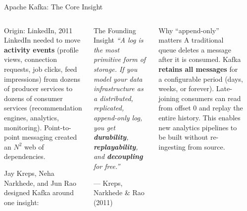 \documentclass[aspectratio=169,10pt]{beamer}
\begin{document}
\begin{frame}{Apache Kafka: The Core Insight}
  \begin{columns}[T]
      \begin{block}{Origin: LinkedIn, 2011}
        LinkedIn needed to move \textbf{activity events} (profile views, connection requests, job clicks, feed impressions) from dozens of producer services to dozens of consumer services (recommendation engines, analytics, monitoring).  Point-to-point messaging created an $N^2$ web of dependencies.

        \vspace{4pt}
        Jay Kreps, Neha Narkhede, and Jun Rao designed Kafka around one insight:
      \end{block}
      \vspace{4pt}
      \begin{alertblock}{The Founding Insight}
        \itshape ``A log is the most primitive form of storage.  If you model your data infrastructure as a distributed, replicated, append-only log, you get \textbf{durability}, \textbf{replayability}, and \textbf{decoupling} for free.''
        \par\hfill --- Kreps, Narkhede \& Rao (2011)
      \end{alertblock}
      \vspace{4pt}
      \begin{exampleblock}{Why ``append-only'' matters}
        \small A traditional queue deletes a message after it is consumed.  Kafka \textbf{retains all messages} for a configurable period (days, weeks, or forever).  Late-joining consumers can read from offset 0 and replay the entire history.  This enables new analytics pipelines to be built without re-ingesting from source.
      \end{exampleblock}

      \begin{center}
\end{center}
\end{columns}
\end{frame}
\end{document}
